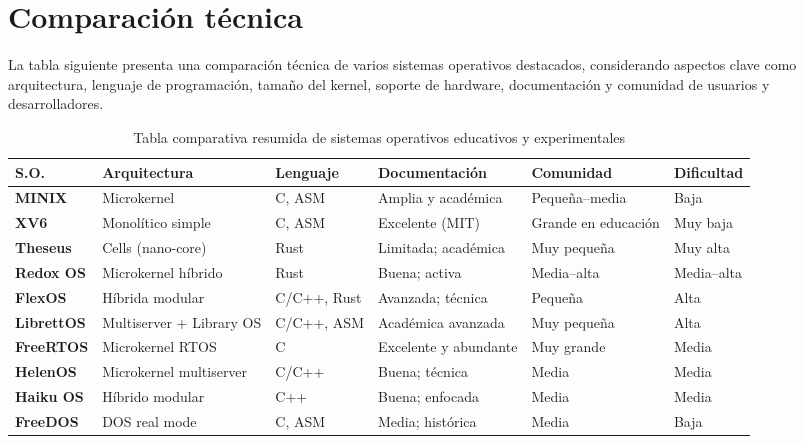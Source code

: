 \chapter{Comparación técnica}

La tabla siguiente presenta una comparación técnica de varios sistemas operativos destacados, considerando aspectos clave como arquitectura, lenguaje de programación, tamaño del kernel, soporte de hardware, documentación y comunidad de usuarios y desarrolladores.
\begin{table}[H]
\centering
\caption{Tabla comparativa resumida de sistemas operativos educativos y experimentales}
\label{tab:so-resumida}
\begin{tabular}{|p{2.3cm}|p{2.7cm}|p{2.2cm}|p{2.2cm}|p{2.2cm}|p{2.3cm}|}
\hline
\textbf{S.O.} & \textbf{Arquitectura} & \textbf{Lenguaje} & \textbf{Documentación} & \textbf{Comunidad} & \textbf{Dificultad} \\ \hline

\textbf{MINIX} &
Microkernel &
C, ASM &
Amplia y académica &
Pequeña–media &
Baja \\ \hline

\textbf{XV6} &
Monolítico simple &
C, ASM &
Excelente (MIT) &
Grande en educación &
Muy baja \\ \hline

\textbf{Theseus} &
Cells (nano-core) &
Rust &
Limitada; académica &
Muy pequeña &
Muy alta \\ \hline

\textbf{Redox OS} &
Microkernel híbrido &
Rust &
Buena; activa &
Media–alta &
Media–alta \\ \hline

\textbf{FlexOS} &
Híbrida modular &
C/C++, Rust &
Avanzada; técnica &
Pequeña &
Alta \\ \hline

\textbf{LibrettOS} &
Multiserver + Library OS &
C/C++, ASM &
Académica avanzada &
Muy pequeña &
Alta \\ \hline

\textbf{FreeRTOS} &
Microkernel RTOS &
C &
Excelente y abundante &
Muy grande &
Media \\ \hline

\textbf{HelenOS} &
Microkernel multiserver &
C/C++ &
Buena; técnica &
Media &
Media \\ \hline

\textbf{Haiku OS} &
Híbrido modular &
C++ &
Buena; enfocada &
Media &
Media \\ \hline

\textbf{FreeDOS} &
DOS real mode &
C, ASM &
Media; histórica &
Media &
Baja \\ \hline

\end{tabular}
\end{table}
